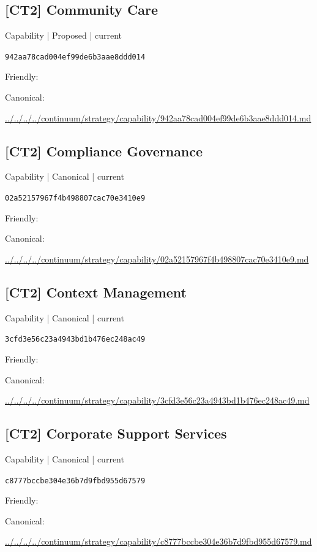 \documentclass[10pt,a4paper]{article}
\begin{document}
\subsection*{[CT2] Community Care}
{\small Capability | Proposed | current}\par
\texttt{942aa78cad004ef99de6b3aae8ddd014}\par
Friendly: \par
Canonical: \par
{\footnotesize\url{../../../../continuum/strategy/capability/942aa78cad004ef99de6b3aae8ddd014.md}}\par
\subsection*{[CT2] Compliance Governance}
{\small Capability | Canonical | current}\par
\texttt{02a52157967f4b498807cac70e3410e9}\par
Friendly: \par
Canonical: \par
{\footnotesize\url{../../../../continuum/strategy/capability/02a52157967f4b498807cac70e3410e9.md}}\par
\subsection*{[CT2] Context Management}
{\small Capability | Canonical | current}\par
\texttt{3cfd3e56c23a4943bd1b476ec248ac49}\par
Friendly: \par
Canonical: \par
{\footnotesize\url{../../../../continuum/strategy/capability/3cfd3e56c23a4943bd1b476ec248ac49.md}}\par
\subsection*{[CT2] Corporate Support Services}
{\small Capability | Canonical | current}\par
\texttt{c8777bccbe304e36b7d9fbd955d67579}\par
Friendly: \par
Canonical: \par
{\footnotesize\url{../../../../continuum/strategy/capability/c8777bccbe304e36b7d9fbd955d67579.md}}\par
\end{document}
